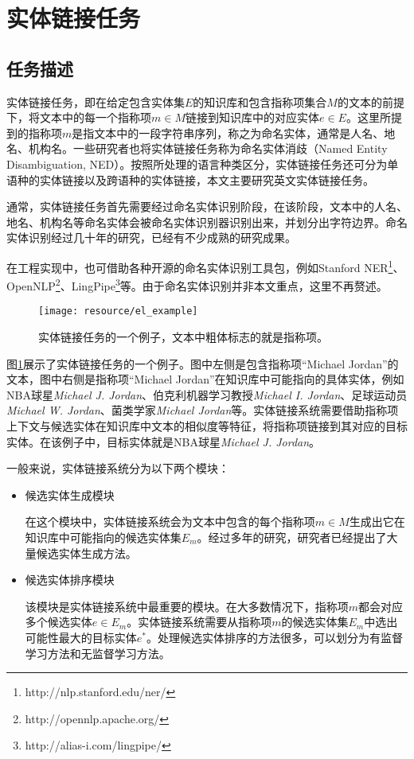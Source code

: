 \section{实体链接任务}
\subsection{任务描述}
实体链接任务，即在给定包含实体集$E$的知识库和包含指称项集合$M$的文本的前提下，将文本中的每一个指称项$m\in M$链接到知识库中的对应实体$e\in E$。这里所提到的指称项$m$是指文本中的一段字符串序列，称之为命名实体，通常是人名、地名、机构名。一些研究者也将实体链接任务称为命名实体消歧（Named Entity Disambiguation, NED）。按照所处理的语言种类区分，实体链接任务还可分为单语种的实体链接以及跨语种的实体链接\cite{CLELBBTM}，本文主要研究英文实体链接任务。

通常，实体链接任务首先需要经过命名实体识别阶段，在该阶段，文本中的人名、地名、机构名等命名实体会被命名实体识别器识别出来，并划分出字符边界。命名实体识别经过几十年的研究，已经有不少成熟的研究成果\cite{RWNERST,NEROEHRTCDA,RHENERCCBEL}。

在工程实现中，也可借助各种开源的命名实体识别工具包，例如Stanford NER\footnote{http://nlp.stanford.edu/ner/}、OpenNLP\footnote{http://opennlp.apache.org/}、LingPipe\footnote{http://alias-i.com/lingpipe/}等。由于命名实体识别并非本文重点，这里不再赘述。

\begin{figure}[!htb]
	\centering\texttt{[image: resource/el\_example]}
	\caption{实体链接任务的一个例子，文本中粗体标志的就是指称项。}
	\label{fig:el_example}
\end{figure}

图\ref{fig:el_example}展示了实体链接任务的一个例子。图中左侧是包含指称项“Michael Jordan”的文本，图中右侧是指称项“Michael Jordan”在知识库中可能指向的具体实体，例如NBA球星\textit{Michael J. Jordan}、伯克利机器学习教授\textit{Michael I. Jordan}、足球运动员\textit{Michael W. Jordan}、菌类学家\textit{Michael Jordan}等。实体链接系统需要借助指称项上下文与候选实体在知识库中文本的相似度等特征，将指称项链接到其对应的目标实体。在该例子中，目标实体就是NBA球星\textit{Michael J. Jordan}。

一般来说，实体链接系统分为以下两个模块：
\begin{itemize}
	\item {候选实体生成模块
	
在这个模块中，实体链接系统会为文本中包含的每个指称项$m \in M$生成出它在知识库中可能指向的候选实体集$E_m$。经过多年的研究，研究者已经提出了大量候选实体生成方法。
}
	\item {候选实体排序模块
	
	该模块是实体链接系统中最重要的模块。在大多数情况下，指称项$m$都会对应多个候选实体$e\in E_m$。实体链接系统需要从指称项$m$的候选实体集$E_m$中选出可能性最大的目标实体$e^*$。处理候选实体排序的方法很多，可以划分为有监督学习方法和无监督学习方法。
}
\end{itemize}

